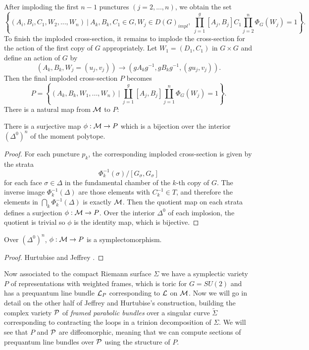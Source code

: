 	After imploding the first $n-1$ punctures $(j=2,...,n)$, we obtain the set
	\begin{equation}
		\left\{
		(A_i,B_i,C_1,W_2,...,W_n)~|~ A_k,B_k,C_1 \in G, W_j \in D(G)_{impl},~ \prod_{j=1}^{g}[A_j,B_j]C_1\prod_{j=2}^{n} \Phi_G(W_j) = 1 
		\right\}.
	\end{equation}
	To finish the imploded cross-section, it remains to implode the cross-section for the action of the first copy of $G$ appropriately. Let $W_1 = (D_1,C_1)$ in $G\times G$ and define an action of $G$ by
	\begin{equation}
		\label{e:first-action}
		\left(A_k,B_k,W_j=(u_j,v_j)\right) \to (gA_kg^{-1}, gB_kg^{-1}, (gu_j,v_j)).
	\end{equation}
	Then the final imploded cross-section $P$ becomes \cite{hurtubise_representations_2000}
	\begin{equation}
		\label{e:P-def}
		P = \left\{(A_k,B_k,W_1,...,W_n)~|~ \coprod_{j=1}^g[A_j,B_j]\coprod_{j=1}^n \Phi_G(W_j)=1\right\}.
	\end{equation}
	There is a natural map from $\mathcal{M}$ to $P$:
	\begin{lemma}
		There is a surjective map $\phi:\mathcal{M}\to P$ which is a bijection over the interior $(\Delta^0)^n$ of the moment polytope. 
	\end{lemma}
	\begin{proof}
		For each puncture $p_k$, the corresponding imploded cross-section is given by the strata
		\begin{equation}
			\Phi_k^{-1}(\sigma)/[G_\sigma, G_\sigma]
		\end{equation}
		for each face $\sigma \in \Delta$ in the fundamental chamber of the $k$-th copy of $G$. The inverse image $\Phi_k^{-1}(\Delta)$ are those elements with $C_k^{-1} \in T$, and therefore the elements in $\bigcap_k \Phi_k^{-1} (\Delta)$ is exactly $\mathcal{M}$. Then the quotient map on each strata defines a surjection $\phi:\mathcal{M}\to P$. Over the interior $\Delta^0$ of each implosion, the quotient is trivial so $\phi$ is the identity map, which is bijective. 
	\end{proof}
	\begin{theorem}
		Over $(\Delta^0)^n$, $\phi:\mathcal{M} \to P$ is a symplectomorphism.
	\end{theorem}
	\begin{proof}
		Hurtubise and Jeffrey \cite[Proposition 2.37]{hurtubise_representations_2000}.
	\end{proof}
	

	\pagebreak
	Now associated to the compact Riemann surface $\Sigma$ we have a symplectic variety $P$ of representations with weighted frames, which is toric for $G=SU(2)$ and has a prequantum line bundle $\mathcal{L}_P$ corresponding to $\mathcal{L}$ on $\mathcal{M}$. Now we will go in detail on the other half of Jeffrey and Hurtubise's construction, building the complex variety $\mathcal{P}$ of \emph{framed parabolic bundles} over a singular curve $\tilde{\Sigma}$ corresponding to contracting the loops in a trinion decomposition of $\Sigma$. We will see that $P$ and $\mathcal{P}$ are diffeomorphic, meaning that we can compute sections of prequantum line bundles over $\mathcal{P}$ using the structure of $P$.
	
